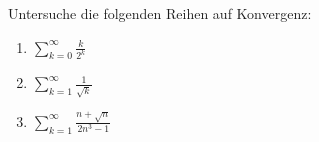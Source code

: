 \begin{exercise}[Reihenkonvergenz]
  Untersuche die folgenden Reihen auf Konvergenz:
  \begin{enumerate}
  \item $\displaystyle \sum_{k = 0}^\infty \frac{k}{2^k}$
  \item $\displaystyle \sum_{k = 1}^\infty \frac{1}{\sqrt{k}}$
  \item $\displaystyle \sum_{k = 1}^\infty \frac{n + \sqrt{n}}{2n^3 - 1}$
  \end{enumerate}
\end{exercise}
